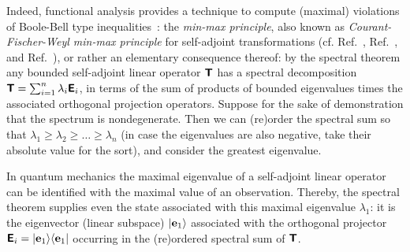 \documentclass[%
  twocolumn,
 showpacs,
 showkeys,
 preprintnumbers,
 amsmath,amssymb,
 aps,
  pra,
  longbibliography,
 floatfix,
 ]{revtex4-1}
\begin{document}
Indeed, functional analysis provides a technique to compute (maximal) violations of Boole-Bell type inequalities~\cite{filipp-svo-04-qpoly,filipp-svo-05}:
the
{\em min-max principle},
also known as
{\em Courant-Fischer-Weyl min-max principle} for self-adjoint transformations
(cf. Ref.~\cite[{\S}~90]{halmos-vs},  Ref.~\cite[pp.~75ff]{reed-sim4},
and  Ref.~\cite[Sect.~4.4, pp.~142ff]{Teschl-schr}),
or rather an elementary consequence thereof:
by the spectral theorem any bounded self-adjoint linear operator $\textsf{\textbf{T}}$ has a spectral decomposition
$\textsf{\textbf{T}}=\sum_{i=1}^{n} \lambda_i \textsf{\textbf{E}}_i$, in terms of the sum of products
of bounded eigenvalues times the associated orthogonal projection operators.
Suppose for the sake of demonstration that the spectrum is nondegenerate.
Then we can (re)order the spectral sum so that $\lambda_1 \ge \lambda_2 \ge \ldots \ge \lambda_n$
(in case the eigenvalues are also negative, take their absolute value for the sort),
and consider  the greatest eigenvalue.%

In quantum mechanics  the maximal eigenvalue of a self-adjoint linear operator can be identified
with the maximal value of an observation.
Thereby, the spectral theorem supplies even the state associated with this maximal eigenvalue $\lambda_1$: it is the
eigenvector (linear subspace)  $\vert {\bf e}_1 \rangle $ associated with the orthogonal projector
 $\textsf{\textbf{E}}_i = \vert {\bf e}_1 \rangle \langle  {\bf e}_1 \vert $ occurring in the (re)ordered
spectral sum  of $\textsf{\textbf{T}}$.
\end{document}
